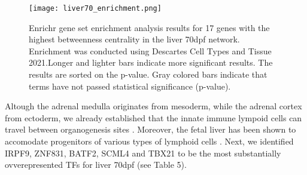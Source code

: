 \documentclass[
	a4paper, %
	10pt, %
	unnumberedsections, %
	twoside, %
]{LTJournalArticle}
\begin{document}
\begin{figure}[H] %
	\texttt{[image: liver70\_enrichment.png]}
	\caption{Enrichr gene set enrichment analysis results for 17 genes
	with the highest betweenness centrality in the liver 70dpf network. Enrichment 
	was conducted using Descartes Cell Types and Tissue 2021.Longer and lighter
	bars indicate more significant results. The results are sorted on
	the p-value. Gray colored bars indicate that terms 
	have not passed statistical significance (p-value).}
	\label{fig:liv70enr}
\end{figure}

\noindent Altough the adrenal medulla originates from mesoderm, while the adrenal
cortex from ectoderm, we already established that the innate immune lympoid cells
can travel between organogenesis sites \autocite{gale1987a, nicolaides2000a, farraj2023a}. 
Moreover, the fetal liver has been 
shown to accomodate progenitors of various types of lymphoid cells \autocite{gale1987a}.
Next, we identified IRPF9, ZNF831, BATF2,
SCML4 and TBX21 to be the most substantially ovverepresented TFs for liver 70dpf (see Table 5).

\begin{table}[H]
	\caption{Transcription Factor Target Over-representation Analysis results for 17 genes with the highest betweenness centrality in the liver 70dpf network from the ChEA3 web tool.}
	\label{tab:liv70_tf}
	\end{table}
\end{document}
